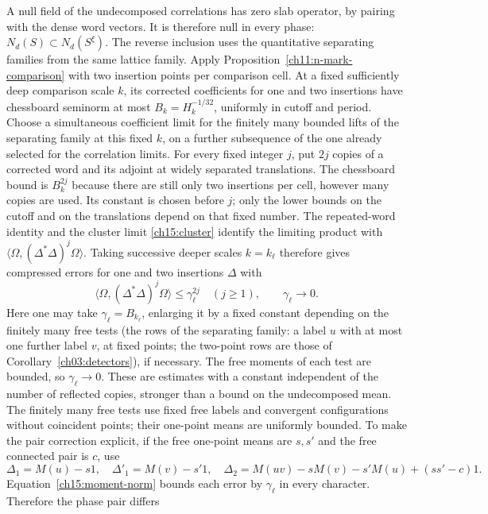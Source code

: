 A null field of the undecomposed correlations has zero slab operator, by pairing with the dense
word vectors. It is therefore null in every phase:
$N_d(S)\subset N_d(S^\xi)$. The reverse inclusion uses the quantitative separating families from the
same lattice family. Apply Proposition~\ref{ch11:n-mark-comparison}
with two insertion points per comparison cell. At a fixed sufficiently deep
comparison scale $k$, its corrected coefficients for one and two insertions
have chessboard seminorm at most $B_k=H_k^{-1/32}$, uniformly in
cutoff and period. Choose a simultaneous coefficient limit for the
finitely many bounded lifts of the separating family at this fixed $k$, on a
further subsequence of the one already selected for the correlation limits.
For every fixed integer $j$, put $2j$ copies of a corrected word
and its adjoint at widely separated translations. The chessboard
bound is $B_k^{2j}$ because there are still only two insertions per cell,
however many copies are used. Its constant is chosen
before $j$; only the lower bounds on the cutoff and on the translations depend on
that fixed number. The repeated-word identity and the cluster
limit \eqref{ch15:cluster} identify the limiting product with
$\langle\Omega,(\Delta^*\Delta)^j\Omega\rangle$.
Taking successive deeper scales $k=k_\ell$ therefore gives
compressed errors for one and two insertions $\Delta$ with
\begin{equation}
 \langle\Omega,(\Delta^*\Delta)^j\Omega\rangle
                  \le\gamma_\ell^{2j}\quad(j\ge1),
                  \qquad \gamma_\ell\longrightarrow0.
 \label{ch15:detector-moments}
\end{equation}
Here one may take $\gamma_\ell=B_{k_\ell}$, enlarging it by
a fixed constant depending on the finitely many free tests (the rows of the separating family: a label $u$ with at most one further label $v$, at fixed points; the two-point rows are those of Corollary~\ref{ch03:detectors}), if necessary. The free moments of each test are
bounded, so $\gamma_\ell\to0$. These are estimates with a constant independent of the number of reflected copies,
stronger than a bound on the undecomposed mean.
The finitely many free tests use fixed free labels and convergent
configurations without coincident points; their one-point means are uniformly bounded.
To make the pair correction explicit, if the free one-point means are $s,s'$ and the free connected pair is $c$, use
\[
 \Delta_1=M(u)-s1,\quad \Delta'_1=M(v)-s'1,\quad
 \Delta_2=M(uv)-sM(v)-s'M(u)+(ss'-c)1.
\]
Equation~\eqref{ch15:moment-norm} bounds each error by
$\gamma_\ell$ in every character. Therefore the phase pair differs
